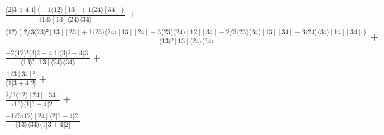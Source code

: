 \documentclass[varwidth, border=5pt]{standalone}
\begin{document}
\begin{my}
$\begin{gathered}
\scriptscriptstyle\frac{⟨2|3+4|1](-1⟨12⟩[13]+1⟨24⟩[34])}{⟨13⟩[13]⟨24⟩⟨34⟩} +\\
\scriptscriptstyle\frac{⟨12⟩(2/3⟨23⟩²[13][23]+1⟨23⟩⟨24⟩[13][24]-3⟨23⟩⟨24⟩[12][34]+2/3⟨23⟩⟨34⟩[13][34]+3⟨24⟩⟨34⟩[14][34])}{⟨13⟩²[13]⟨24⟩⟨34⟩} +\\
\scriptscriptstyle\frac{-2⟨12⟩²⟨3|2+4|1]⟨3|2+4|3]}{⟨13⟩³[13]⟨24⟩⟨34⟩} +\\
\scriptscriptstyle\frac{1/3[34]²}{⟨1|3+4|2]} +\\
\scriptscriptstyle\frac{2/3⟨12⟩[24][34]}{⟨13⟩⟨1|3+4|2]} +\\
\scriptscriptstyle\frac{-1/3⟨12⟩[24]⟨2|3+4|2]}{⟨13⟩⟨34⟩⟨1|3+4|2]} \phantom{+}
\end{gathered}$
\end{my}
\end{document}
